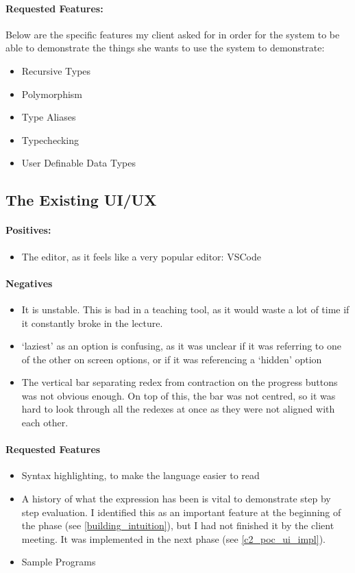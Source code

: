 \paragraph{Requested Features:}
Below are the specific features my client asked for in order for the system to be able to demonstrate the things she wants to use the system to demonstrate:
\begin{itemize}
    \item Recursive Types
    \item Polymorphism
    \item Type Aliases
    \item Typechecking
    \item User Definable Data Types
\end{itemize}

\subsection{The Existing UI/UX}
\paragraph{Positives:}
\begin{itemize}
    \item The editor, as it feels like a very popular editor: VSCode
\end{itemize}

\paragraph{Negatives}
\begin{itemize}
    \item It is unstable. This is bad in a teaching tool, as it would waste a lot of time if it constantly broke in the lecture. 
    \item `laziest' as an option is confusing, as it was unclear if it was referring to one of the other on screen options, or if it was referencing a `hidden' option
    \item The vertical bar separating redex from contraction on the progress buttons was not obvious enough. On top of this, the bar was not centred, so it was hard to look through all the redexes at once as they were not aligned with each other. 
\end{itemize}

\paragraph{Requested Features}
\begin{itemize}
    \item Syntax highlighting, to make the language easier to read   
    \item A history of what the expression has been is vital to demonstrate step by step evaluation. I identified this as an important feature at the beginning of the phase (see \ref{building_intuition}), but I had not finished it by the client meeting. It was implemented in the next phase (see \ref{c2_poc_ui_impl}). 
    \item Sample Programs
\end{itemize}

